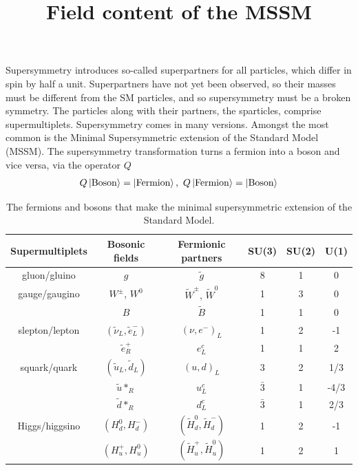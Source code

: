 \documentclass[11pt]{article}
\begin{document}
\begin{flushleft}
Supersymmetry introduces so-called superpartners for all particles, which differ in spin by half a unit. Superpartners have not yet been observed, so their masses must be different from the SM particles, and so supersymmetry must be a broken symmetry. The particles along with their partners, the sparticles, comprise supermultiplets. Supersymmetry comes in many versions. Amongst the most common is the Minimal Supersymmetric extension of the Standard Model (MSSM). The supersymmetry transformation turns a fermion into a boson and vice versa, via the operator $Q$
\begin{align*}
Q \ket{\text{Boson}} = \ket{\text{Fermion}}, \text{ } Q \ket{\text{Fermion}} = \ket{\text{Boson}} 
\end{align*}
\begin{table}[H]
\centering
\title{\textbf{Field content of the MSSM}}

\begin{tabular}{|c|c|c|c|c|c|}
\hline
Supermultiplets & Bosonic fields & Fermionic partners & SU(3) & SU(2) & U(1)\\
\hline
gluon/gluino & $g$ & $\tilde{g}$ & 8 & 1 & 0\\
gauge/gaugino & $W^{\pm}$, $W^0$ & $\tilde{W}^{\pm}$, $\tilde{W}^0$ & 1 & 3 & 0\\
& $B$ & $\tilde{B}$ & 1 & 1 & 0\\
\hline
slepton/lepton & $(\tilde{\nu}_L, \tilde{e}_L^-)$ & $(\nu, e^-)_L$ & 1 & 2 & -1\\
& $\tilde{e}^+_R$ & $e^c_L$ & 1 & 1 & 2\\
\hline
squark/quark & $(\tilde{u}_L, \tilde{d}_L)$ & $(u,d)_L$ & 3 & 2 & 1/3\\
& $\tilde{u}*_R$ & $u^c_L$ & $\bar{3}$ & 1 & -4/3\\
& $\tilde{d}*_R$ & $d^c_L$ & $\bar{3}$ & 1 & 2/3\\
\hline
Higgs/higgsino & $(H^0_d, H^-_d)$ & $(\tilde{H}_d^0, \tilde{H}_d^-)$ & 1 & 2 & -1\\
& $(H_u^+, H^0_u)$ & $(\tilde{H}_u^+, \tilde{H}^0_u)$ & 1 & 2 & 1\\
\hline
\end{tabular}
\caption{The fermions and bosons that make the minimal supersymmetric extension of the Standard Model. }
\end{table}
\end{flushleft}
\end{document}
